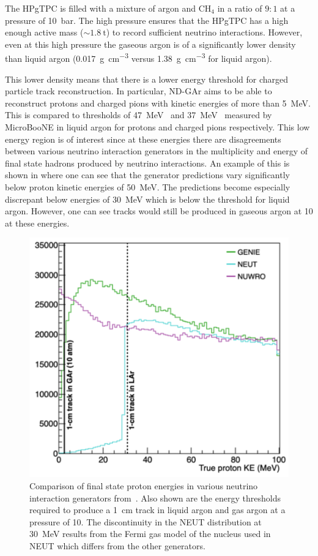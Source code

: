 The HPgTPC is filled with a mixture of argon and $\text{CH}_{4}$ in a ratio of $9:1$ at a pressure of \SI{10}{\bar}.
The high pressure ensures that the HPgTPC has a high enough active mass ($\sim\SI{1.8}{\tonne}$) to record sufficient neutrino interactions.
However, even at this high pressure the gaseous argon is of a significantly lower density than liquid argon (\SI{0.017}{\gram\per\cubic\centi\metre} versus \SI{1.38}{\gram\per\cubic\centi\metre} for liquid argon).

This lower density means that there is a lower energy threshold for charged particle track reconstruction.
In particular, ND-GAr aims to be able to reconstruct protons and charged pions with kinetic energies of more than \SI{5}{\mega\electronvolt}.
This is compared to thresholds of \SI{47}{\mega\electronvolt}~\cite{uBooneProtonThreshold} and \SI{37}{\mega\electronvolt}~\cite{uBoonePionThreshold} measured by MicroBooNE in liquid argon for protons and charged pions respectively.
This low energy region is of interest since at these energies there are disagreements between various neutrino interaction generators in the multiplicity and energy of final state hadrons produced by neutrino interactions.
An example of this is shown in  where one can see that the generator predictions vary significantly below proton kinetic energies of \SI{50}{\mega\electronvolt}.
The predictions become especially discrepant below energies of \SI{30}{\mega\electronvolt} which is below the threshold for liquid argon.
However, one can see tracks would still be produced in gaseous argon at \SI{10}{\atmosphere} at these energies.

\begin{figure}[h]
  \centering
  \includegraphics[width=.5\linewidth]{files/figures/dune_detector/generatorProtons}
  \caption[Comparison of final state proton kinetic energies in various neutrino interaction generators]{Comparison of final state proton energies in various neutrino interaction generators from~\cite{ndCdr}. Also shown are the energy thresholds required to produce a \SI{1}{\centi\metre} track in liquid argon and gas argon at a pressure of \SI{10}{\atmosphere}. The discontinuity in the NEUT distribution at \SI{30}{\MeV} results from the Fermi gas model of the nucleus used in NEUT which differs from the other generators.}
  \label{fig:generatorProtons}
\end{figure}

